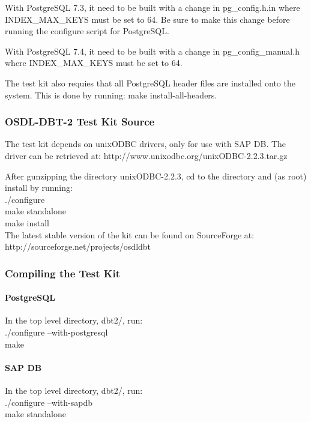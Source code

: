 \documentclass{article}
\begin{document}
\noindent
With PostgreSQL 7.3, it need to be built with a change in pg\_config.h.in where
INDEX\_MAX\_KEYS must be set to 64.  Be sure to make this change before running
the configure script for PostgreSQL.

\noindent
With PostgreSQL 7.4, it need to be built with a change in pg\_config\_manual.h
where INDEX\_MAX\_KEYS must be set to 64.

\noindent
The test kit also requies that all PostgreSQL header files are installed onto
the system.  This is done by running: make install-all-headers.

\subsubsection{OSDL-DBT-2 Test Kit Source}

\noindent
The test kit depends on unixODBC drivers, only for use with SAP DB.  The driver
can be retrieved at: http://www.unixodbc.org/unixODBC-2.2.3.tar.gz

\noindent
After gunzipping the directory unixODBC-2.2.3, cd to the directory and (as
root) install by running: \\
\indent ./configure \\
\indent make standalone \\
\indent make install \\

\noindent
The latest stable version of the kit can be found on SourceForge at: \\
\indent http://sourceforge.net/projects/osdldbt

\subsubsection{Compiling the Test Kit}

\paragraph{PostgreSQL}

In the top level directory, dbt2/, run: \\
\indent ./configure --with-postgresql \\
\indent make

\paragraph{SAP DB}

In the top level directory, dbt2/, run: \\
\indent ./configure --with-sapdb \\
\indent make standalone
\end{document}
